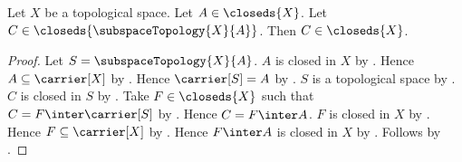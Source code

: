 \begin{theorem}\label{closed_of_closed_in_closed_subspace}
    Let $X$ be a topological space.
    Let $A\in\closeds{X}$.
    Let $C\in\closeds{\subspaceTopology{X}{A}}$.
    Then $C\in\closeds{X}$.
\end{theorem}
\begin{proof}
    Let $S=\subspaceTopology{X}{A}$.
    $A$ is closed in $X$ by .
    Hence $A\subseteq\carrier[X]$
        by .
    Hence $\carrier[S]=A$
        by .
    $S$ is a topological space
        by .
    $C$ is closed in $S$ by .
    Take $F\in\closeds{X}$ such that
        $C=F\inter\carrier[S]$ by .
    Hence $C=F\inter A$.
    $F$ is closed in $X$ by .
    Hence $F\subseteq\carrier[X]$
        by .
    Hence $F\inter A$ is closed in $X$
        by .
    Follows by .
\end{proof}
